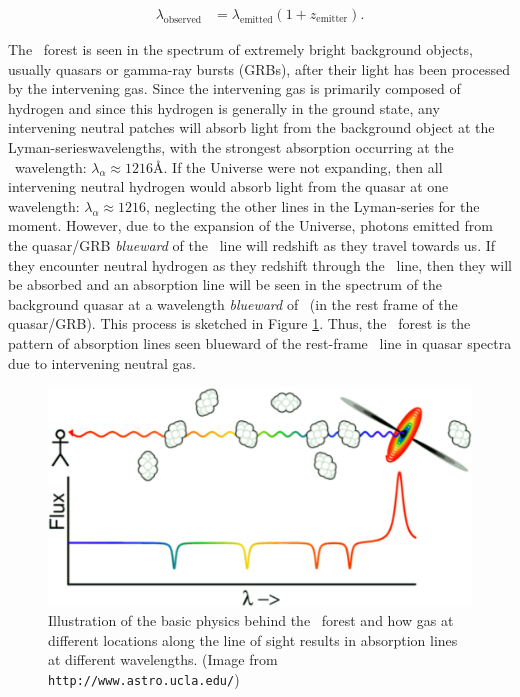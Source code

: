 \begin{align}
\lambda_{\text{observed}} &= \lambda_{\text{emitted}}(1+z_{\text{emitter}}). 
\end{align}

The \lya\ forest is seen in the spectrum of extremely bright background objects, usually quasars  or gamma-ray bursts (GRBs), after their light has been processed by the intervening gas. Since the intervening gas is primarily composed of hydrogen and since this hydrogen is generally in the ground state, any intervening neutral patches will absorb light from the background object at the Lyman-serieswavelengths, with the strongest absorption occurring at the \lya\ wavelength: $\lambda_{\alpha} \approx 1216$\AA. If the Universe were not expanding, then all intervening neutral hydrogen would absorb light from the quasar at one wavelength: $\lambda_{\alpha} \approx 1216$\angstrom, neglecting the other lines in the Lyman-series for the moment. However, due to the expansion of the Universe, photons emitted from the quasar/GRB \textit{blueward} of the \lya\ line will redshift as they travel towards us. If they encounter neutral hydrogen as they redshift through the \lya\ line, then they will be absorbed and an absorption line will be seen in the spectrum of the background quasar at a wavelength \textit{blueward} of \lya\ (in the rest frame of the quasar/GRB). This process is sketched in Figure \ref{fig:LyaCartoon}. Thus, the \lya\ forest is the pattern of absorption lines seen blueward of the rest-frame \lya\ line in quasar spectra due to intervening neutral gas. 

\begin{figure}[h]
  \centering
  \includegraphics[width=12cm]{lyaf-75.eps}
  \caption{Illustration of the basic physics behind the \lya\ forest and how gas at different locations along the line of sight results in absorption lines at different wavelengths. (Image from {\tt http://www.astro.ucla.edu/})}
  \label{fig:LyaCartoon}
\end{figure}

